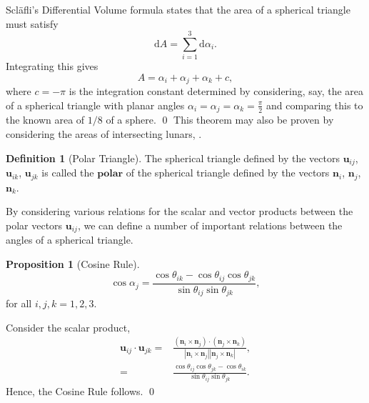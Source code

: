 \documentclass[fleqn,11pt,twoside]{article}
\makeatletter
\renewenvironment{proof}[1][\proofname]{\par
  \normalfont
  \topsep6\p@\@plus6\p@ \trivlist
  \item[\hskip\labelsep\textbf{%
    #1\@addpunct{.}}]\ignorespaces
}{%
  \qed\endtrivlist
}
\theoremstyle{definition}
\newtheorem{prop}{Proposition}
\newtheorem{defn}{Definition}
\makeatother
\begin{document}
\begin{proof}
Scl\"afli's Differential Volume formula states that the area of a spherical triangle must satisfy
\begin{equation}
\mathrm{d}A=\sum_{i=1}^3\mathrm{d}\alpha_i.
\end{equation}
Integrating this gives
\begin{equation}
A=\alpha_i+\alpha_j+\alpha_k+c,
\end{equation}
where $c=-\pi$ is the integration constant determined by considering, say, the area of a spherical triangle with planar angles $\alpha_i=\alpha_j=\alpha_k=\frac{\pi}{2}$ and comparing this to the known area of $1/8$ of a sphere.
\end{proof}
This theorem may also be proven by considering the areas of intersecting lunars, \cite{1}.
\begin{defn}[Polar Triangle]
The spherical triangle defined by the vectors $\mathbf{u}_{ij}$, $\mathbf{u}_{ik}$, $\mathbf{u}_{jk}$ is called the $\mathbf{polar}$ of the spherical triangle defined by the vectors $\mathbf{n}_{i}$, $\mathbf{n}_{j}$, $\mathbf{n}_{k}$.
\end{defn}
By considering various relations for the scalar and vector products between the polar vectors $\textbf{u}_{ij}$, we can define a number of important relations between the angles of a spherical triangle.
\begin{prop}[Cosine Rule]
\begin{equation}\label{eq:23}
\cos\alpha_{j}=\frac{\cos\theta_{ik}-\cos\theta_{ij}\cos\theta_{jk}}{\sin\theta_{ij}\sin\theta_{jk}},
\end{equation} for all $i,j,k=1,2,3$. 
\end{prop}

\begin{proof}
Consider the scalar product,
\begin{equation}
\begin{split}
\textbf{u}_{ij}\cdot\textbf{u}_{jk}
=&\frac
{(\textbf{n}_i\times\textbf{n}_j)\cdot(\textbf{n}_j\times\textbf{n}_k)}
{\left|\textbf{n}_i\times\textbf{n}_j\right|\left|\textbf{n}_j\times\textbf{n}_k\right|},\\
=&\frac{\cos\theta_{ij}\cos\theta_{jk}-\cos\theta_{ik}}
{\sin\theta_{ij}\sin\theta_{jk}}.
\end{split}
\end{equation}
Hence, the Cosine Rule follows.
\end{proof}
\end{document}
